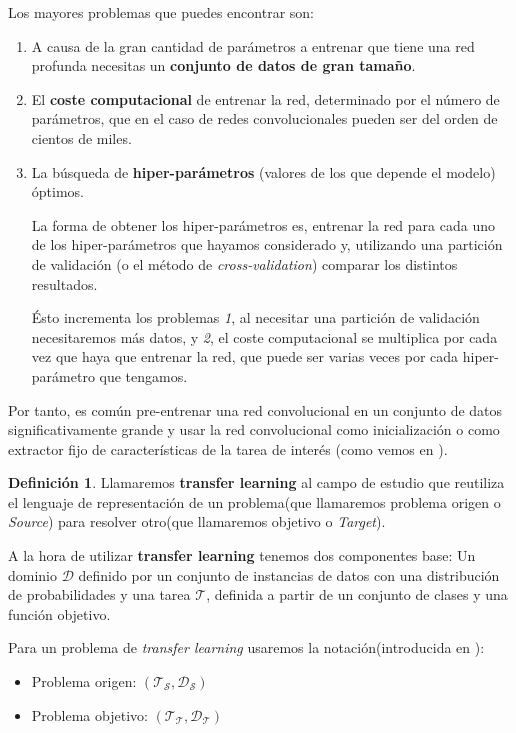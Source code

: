 \documentclass[12,twoside]{TFG-GM}
\theoremstyle{definition}
\newtheorem{definition}[theorem]{Definición}
\theoremstyle{remark}
\begin{document}
Los mayores problemas que puedes encontrar son: 
\begin{enumerate}
\item A causa de la gran cantidad de parámetros a entrenar que tiene una red profunda necesitas un \textbf{conjunto de datos de gran tamaño}.
\item El \textbf{coste computacional} de entrenar la red, determinado por el número de parámetros, que en el caso de redes convolucionales pueden ser del orden de cientos de miles. 
\item La búsqueda de \textbf{hiper-parámetros} (valores de los que depende el modelo) óptimos. \par

La forma de obtener los hiper-parámetros es, entrenar la red para cada uno de los hiper-parámetros que hayamos considerado y, utilizando una partición de validación (o el método de \textit{cross-validation}) comparar los distintos resultados.  \par

Ésto incrementa los problemas \textit{1}, al necesitar una partición de validación necesitaremos más datos, y \textit{2}, el coste computacional se multiplica por cada vez que haya que entrenar la red, que puede ser varias veces por cada hiper-parámetro que tengamos.
\end{enumerate}\par
Por tanto, es común pre-entrenar una red convolucional en un conjunto de datos significativamente grande y usar la red convolucional como inicialización o como extractor fijo de características de la tarea de interés (como vemos en \cite{he2016deep}). 
\begin{definition}
Llamaremos \textbf{transfer learning} al campo de estudio que reutiliza el lenguaje de representación de un problema(que llamaremos problema origen o \textit{Source}) para resolver otro(que llamaremos objetivo o \textit{Target}). 

A la hora de utilizar \textbf{transfer learning} tenemos dos componentes base:  Un dominio $\mathcal{D}$ definido por un conjunto de instancias de datos con una distribución de probabilidades y una tarea $\mathcal{T}$, definida a partir de un conjunto de clases y una función objetivo.

Para un problema de \textit{transfer learning} usaremos la notación(introducida en \cite{pan2010survey}): 
\begin{itemize}
\item Problema origen: $(\mathcal{T_S},\mathcal{D_S})$
\item Problema objetivo: $(\mathcal{T_T},\mathcal{D_T})$
\end{itemize}

\end{definition}
\end{document}
